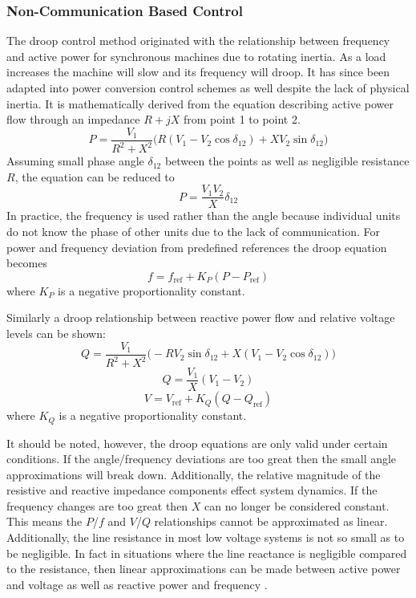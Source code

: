 \subsubsection{Non-Communication Based Control}
The droop control method originated with the relationship between frequency and active power for synchronous machines due to rotating inertia. As a load increases the machine will slow and its frequency will droop. It has since been adapted into power conversion control schemes as well despite the lack of physical inertia. It is mathematically derived from the equation describing active power flow through an impedance $ R + jX $ from point 1 to point 2.
\begin{equation}
P = \frac{V_{1}}{R^2 + X^2} \big( R \left( V_{1}-V_{2}\cos{\delta_{12}} \right) +X V_{2} \sin{\delta_{12}} \big)
\end{equation}
Assuming small phase angle $\delta_{12}$ between the points as well as negligible resistance $R$, the equation can be reduced to 
\begin{equation}
P = \frac{V_1V_2}{X}\delta_{12}
\end{equation}
In practice, the frequency is used rather than the angle because individual units do not know the phase of other units due to the lack of communication. For power and frequency deviation from predefined references the droop equation becomes
\begin{equation}
f = f_{\text{ref}} + K_P\left(P - P_{\text{ref}}\right)
\end{equation}
where $K_P$ is a negative proportionality constant.

Similarly a droop relationship between reactive power flow and relative voltage levels can be shown:
\begin{equation}
Q = \frac{V_1}{R^2 + X^2} \big( -R V_2 \sin{\delta_{12}} + X \left(V_1 - V_2 \cos{\delta_{12}}\right) \big)
\end{equation}
\begin{equation}
Q = \frac{V_1}{X} \left( V_1 - V_2 \right)
\end{equation}
\begin{equation}
V = V_{\text{ref}} + K_Q \left( Q - Q_{\text{ref}} \right)
\end{equation}
where $K_Q$ is a negative proportionality constant. 

It should be noted, however, the droop equations are only valid under certain conditions. If the angle/frequency deviations are too great then the small angle approximations will break down. Additionally, the relative magnitude of the resistive and reactive impedance components effect system dynamics. If the frequency changes are too great then $X$ can no longer be considered constant. This means the $P$\slash $f$ and $V$\slash $Q$ relationships cannot be approximated as linear. Additionally, the line resistance in most low voltage systems is not so small as to be negligible. In fact in situations where the line reactance is negligible compared to the resistance, then linear approximations can be made between active power and voltage as well as reactive power and frequency \cite{YunWeiLi2009}.


